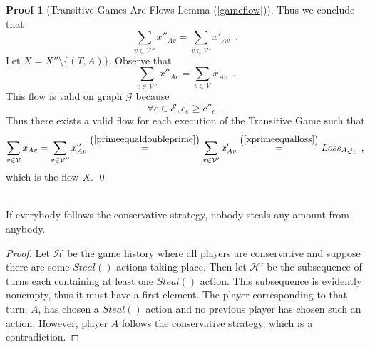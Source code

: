 \documentclass[11pt]{llncs}
\theoremstyle{definition}
\newtheorem*{sepproof}{Proof}
\begin{document}
\begin{sepproof}[Transitive Games Are Flows Lemma (\ref{gameflow})]
       Thus we conclude that
       \begin{equation}
       \label{primeequaldoubleprime}
          \sum\limits_{v \in \mathcal{V}''}x''_{Av} = \sum\limits_{v \in \mathcal{V}'}x'_{Av} \enspace.
       \end{equation}
       Let $X = X'' \setminus \{(T, A)\}$. Observe that
       \begin{equation*}
          \sum\limits_{v \in \mathcal{V}''}x''_{Av} = \sum\limits_{v \in \mathcal{V}}x_{Av} \enspace.
       \end{equation*}
       This flow is valid on graph $\mathcal{G}$ because
       \begin{equation*}
          \forall e \in \mathcal{E}, c_e \geq c''_e \enspace.
       \end{equation*}
       Thus there exists a valid flow for each execution of the Transitive Game such that
       \begin{equation*}
          \sum\limits_{v \in \mathcal{V}}x_{Av} = \sum\limits_{v \in \mathcal{V}''}x''_{Av}
          \overset{\left(\ref{primeequaldoubleprime}\right)}{=} \sum\limits_{v \in \mathcal{V}'}x'_{Av}
          \overset{\left(\ref{xprimeequalloss}\right)}{=} Loss_{A, j_1} \enspace,
       \end{equation*}
       which is the flow $X$. \qed
    \end{sepproof}

    \begin{theorem} \ \\
       \label{conservativeworld}
       If everybody follows the conservative strategy, nobody steals any amount from anybody.
    \end{theorem}
     \begin{proof}
        Let $\mathcal{H}$ be the game history where all players are conservative and suppose there are some
        $Steal\left(\right)$ actions taking place. Then let $\mathcal{H}'$ be the subsequence of turns each containing at
        least one $Steal\left(\right)$ action. This subsequence is evidently nonempty, thus it must have a first element. The
        player corresponding to that turn, $A$, has chosen a $Steal\left(\right)$ action and no previous player has chosen
        such an action. However, player $A$ follows the conservative strategy, which is a contradiction.
     \end{proof}
\end{document}
